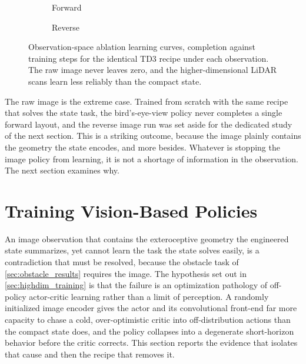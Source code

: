 \begin{figure}[H]
    \centering
    \begin{subfigure}{0.49\textwidth}
        \centering
        \caption{Forward}
        \label{fig:forward_obs_ablation}
    \end{subfigure}
    \hfill
    \begin{subfigure}{0.49\textwidth}
        \centering
        \caption{Reverse}
        \label{fig:reverse_obs_ablation}
    \end{subfigure}
    \caption{Observation-space ablation learning curves, completion against training steps for the identical TD3 recipe under each observation. The raw image never leaves zero, and the higher-dimensional LiDAR scans learn less reliably than the compact state.}
    \label{fig:obs_ablation}
\end{figure}

The raw image is the extreme case. Trained from scratch with the same recipe that solves the state task, the bird's-eye-view policy never completes a single forward layout, and the reverse image run was set aside for the dedicated study of the next section. This is a striking outcome, because the image plainly contains the geometry the state encodes, and more besides. Whatever is stopping the image policy from learning, it is not a shortage of information in the observation. The next section examines why.

\section{Training Vision-Based Policies}
\label{sec:vision}

An image observation that contains the exteroceptive geometry the engineered state summarizes, yet cannot learn the task the state solves easily, is a contradiction that must be resolved, because the obstacle task of \cref{sec:obstacle_results} requires the image. The hypothesis set out in \cref{sec:highdim_training} is that the failure is an optimization pathology of off-policy actor-critic learning rather than a limit of perception. A randomly initialized image encoder gives the actor and its convolutional front-end far more capacity to chase a cold, over-optimistic critic into off-distribution actions than the compact state does, and the policy collapses into a degenerate short-horizon behavior before the critic corrects. This section reports the evidence that isolates that cause and then the recipe that removes it.

